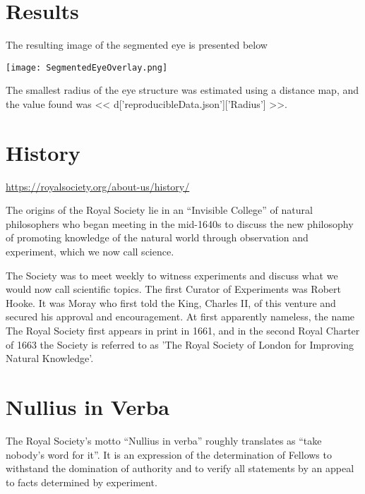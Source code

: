 \documentclass{article}
\begin{document}
\section{Results}

The resulting image of the segmented eye is presented below

\texttt{[image: SegmentedEyeOverlay.png]}

The smallest radius of the eye structure was estimated using a distance map,
and the value found was << d['reproducibleData.json']['Radius'] >>.

\section{History}

\url{https://royalsociety.org/about-us/history/}

The origins of the Royal Society lie in an ``Invisible College'' of natural
philosophers who began meeting in the mid-1640s to discuss the new philosophy
of promoting knowledge of the natural world through observation and experiment,
which we now call science.

The Society was to meet weekly to witness experiments and discuss what we would
now call scientific topics. The first Curator of Experiments was Robert Hooke.
It was Moray who first told the King, Charles II, of this venture and secured
his approval and encouragement. At first apparently nameless, the name The
Royal Society first appears in print in 1661, and in the second Royal Charter
of 1663 the Society is referred to as 'The Royal Society of London for
Improving Natural Knowledge'.

\section{Nullius in Verba}

The Royal Society's motto ``Nullius in verba'' roughly translates as ``take
nobody's word for it''. It is an expression of the determination of Fellows to
withstand the domination of authority and to verify all statements by an appeal
to facts determined by experiment.
\end{document}
